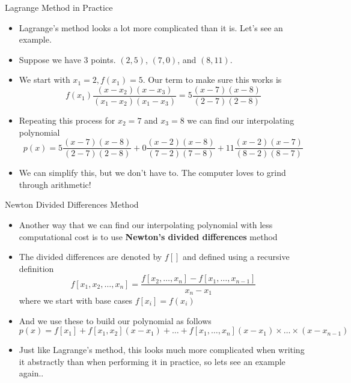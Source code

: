 {}\documentclass[letterpaper,
compress,
xcolor=x11names,
]{beamer}
\begin{document}

\begin{frame}{Lagrange Method in Practice}
	\footnotesize
	\begin{itemize}
		\item Lagrange's method looks a lot more complicated than it is. Let's see an example.
		\item Suppose we have 3 points. $(2,5)$, $(7,0)$, and $(8,11)$.
		\item We start with $x_1 = 2, f(x_1) = 5$. Our term to make sure this works is 
		\begin{equation*}
			f(x_1)\frac{(x-x_2)(x-x_3)}{(x_1 - x_2)(x_1 - x_3)} = 5\frac{(x-7)(x-8)}{(2-7)(2-8)}
		\end{equation*}
		\item Repeating this process for $x_2 = 7$ and $x_3 = 8$ we can find our interpolating polynomial
		\begin{equation*}
			p(x) = 5\frac{(x-7)(x-8)}{(2-7)(2-8)} + 0\frac{(x-2)(x-8)}{(7-2)(7-8)} + 11\frac{(x-2)(x-7)}{(8-2)(8-7)}
		\end{equation*}
		\item We can simplify this, but we don't have to. The computer loves to grind through arithmetic!
	\end{itemize}
\end{frame}



\begin{frame}{Newton Divided Differences Method}
	\footnotesize
	\begin{itemize}
		\item Another way that we can find our interpolating polynomial with less computational cost is to use \textbf{Newton's divided differences} method
		\item The divided differences are denoted by $f[]$ and defined using a recursive definition
		\begin{equation*}
			f[x_1, x_2, \dots, x_n] = \frac{f[x_2,\dots,x_n] - f[x_1,\dots,x_{n-1}]}{x_n - x_1}
		\end{equation*}
		where we start with base cases $f[x_i] = f(x_i)$
		\item And we use these to build our polynomial as follows
		\begin{equation*}
			p(x) = f[x_1] + f[x_1,x_2](x-x_1) + \dots + f[x_1,\dots,x_n](x-x_1)\times\dots\times(x-x_{n-1})
		\end{equation*}
		\item Just like Lagrange's method, this looks much more complicated when writing it abstractly than when performing it in practice, so lets see an example again..
	\end{itemize}
\end{frame}
\end{document}
